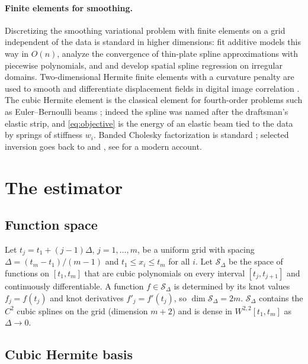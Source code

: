 \documentclass[11pt,a4paper]{article}
\theoremstyle{definition}
\theoremstyle{remark}
\newcommand{\Sd}{\mathcal{S}_\Delta}
\begin{document}
\paragraph{Finite elements for smoothing.} Discretizing the smoothing variational problem with finite elements on a grid independent of the data is standard in higher dimensions: \citet{HeglandMcIntoshTurlach1999} fit additive models this way in $O(n)$, \citet{RobertsHeglandAltas2003} analyze the convergence of thin-plate spline approximations with piecewise polynomials, and \citet{Ramsay2002} and \citet{SangalliRamsayRamsay2013} develop spatial spline regression on irregular domains. Two-dimensional Hermite finite elements with a curvature penalty are used to smooth and differentiate displacement fields in digital image correlation \citep{ZhaoEtAl2012,ZhaoSongWu2015}. The cubic Hermite element is the classical element for fourth-order problems such as Euler--Bernoulli beams \citep{Przemieniecki1968,StrangFix1973,Hughes2000,ZienkiewiczTaylorZhu2013}; indeed the spline was named after the draftsman's elastic strip, and \eqref{eq:objective} is the energy of an elastic beam tied to the data by springs of stiffness $w_i$. Banded Cholesky factorization is standard \citep{GolubVanLoan2013}; selected inversion goes back to \citet{TakahashiFaganChin1973} and \citet{ErismanTinney1975}, see \citet{LinEtAl2009} for a modern account.

\section{The estimator}
\label{sec:estimator}

\subsection{Function space}

Let $t_j=t_1+(j-1)\Delta$, $j=1,\dots,m$, be a uniform grid with spacing $\Delta=(t_m-t_1)/(m-1)$ and $t_1\le x_i\le t_m$ for all $i$. Let $\Sd$ be the space of functions on $[t_1,t_m]$ that are cubic polynomials on every interval $[t_j,t_{j+1}]$ and continuously differentiable. A function $f\in\Sd$ is determined by its knot values $f_j=f(t_j)$ and knot derivatives $f'_j=f'(t_j)$, so $\dim\Sd=2m$. $\Sd$ contains the $C^2$ cubic splines on the grid (dimension $m+2$) and is dense in $W^{2,2}[t_1,t_m]$ as $\Delta\to 0$.

\subsection{Cubic Hermite basis}
\end{document}
